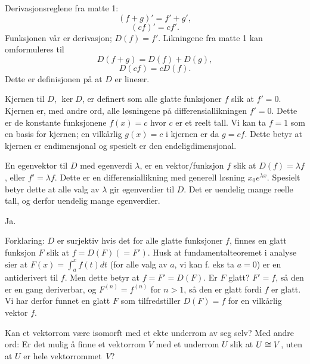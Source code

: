 \begin{losning}

\begin{punkt}
Derivasjonsreglene fra matte 1: 
$$(f+g)'=f'+g',$$ $$(cf)'=cf'.$$ Funksjonen vår er derivasjon; $D(f)=f'$. Likningene fra matte 1 kan omformuleres til $$D(f+g)=D(f)+D(g),$$ $$D(cf)=cD(f).$$ Dette er definisjonen på at $D$ er lineær.
\end{punkt}

\begin{punkt}
Kjernen til $D$, $\ker D$, er definert som alle glatte funksjoner $f$ slik at $f'=0$. Kjernen er, med andre ord, alle løsningene på differensiallikningen $f'=0$. Dette er de konstante funksjonene $f(x)=c$ hvor $c$ er et reelt tall. Vi kan ta $f=1$ som en basis for kjernen; en vilkårlig $g(x)=c$ i kjernen er da $g=cf$. Dette betyr at kjernen er endimensjonal og spesielt er den endeligdimensjonal.
\end{punkt}

\begin{punkt}
En egenvektor til $D$ med egenverdi $\lambda$, er en vektor/funksjon $f$ slik at $D(f)=\lambda f$, eller $f'=\lambda f$. Dette er en differensiallikning med generell løsning $x_0e^{\lambda x}$. Spesielt betyr dette at alle valg av $\lambda$ gir egenverdier til $D$. Det er uendelig mange reelle tall, og derfor uendelig mange egenverdier.
\end{punkt}

\begin{punkt}
Ja.

\noindent
Forklaring: $D$ er surjektiv hvis det for alle glatte funksjoner $f$, finnes en glatt funksjon $F$ slik at $f=D(F)(=F')$. Husk at fundamentalteoremet i analyse sier at $F(x)=\int_a^x f(t)dt$ (for alle valg av $a$, vi kan f. eks ta $a=0$) er en antiderivert til $f$. Men dette betyr at $f=F'=D(F)$. Er $F$ glatt? $F'=f$, så den er en gang deriverbar, og $F^{(n)}=f^{(n)}$ for $n>1$, så den er glatt fordi $f$ er glatt. Vi har derfor funnet en glatt $F$ som tilfredstiller $D(F)=f$ for en vilkårlig vektor $f$.
\end{punkt}

\end{losning}


\begin{oppgave}
Kan et vektorrom være isomorft med et ekte underrom av seg selv?
Med andre ord: 
Er det mulig å finne et vektorrom $V$ med et underrom $U$
slik at $U \cong V$, uten at $U$  er hele vektorrommet~$V$?
\end{oppgave}


